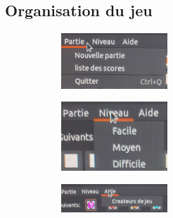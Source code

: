 \documentclass[a4paper, 11pt, oneside]{article}
\begin{document}
\newpage

\subsection{Organisation du jeu}
\begin{figure}[!h]
    \centering
    \begin{subfigure}[]{}
        \includegraphics[width=4cm]{./images/partie.jpg}
    \end{subfigure}
    \begin{subfigure}[]{}
        \includegraphics[width=4cm]{./images/niveau.jpg}
    \end{subfigure}
    \begin{subfigure}[]{}
        \includegraphics[width=4cm]{./images/createur1.jpg}
    \end{subfigure}

\end{figure}
\end{document}
